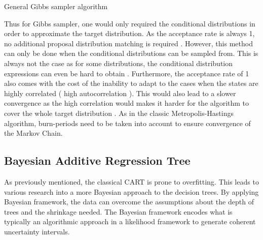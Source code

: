 \documentclass{usiinftr}
\begin{document}
\begin{algorithm}[h]
  \caption{General Gibbs sampler algorithm} \label{algGibbs}
  \begin{algorithmic}[1]
    \Statex
    	\State { $ \vdots $ }
    \EndFor
    \State \Return{$\theta$}
    \EndFunction
  \end{algorithmic}
\end{algorithm}

Thus for Gibbs sampler, one would only required the conditional distributions in order to approximate the 
target distribution. As the acceptance rate is always 1, no additional proposal distribution matching is required \cite{21}. However, this method can only be done when the conditional distributions can be sampled from. This is always not the case as for some distributions, the conditional distribution expressions can even be hard to obtain \cite{21}. Furthermore, the acceptance rate of 1 also comes with the cost of the inability to adapt to the cases when the states are highly correlated ( high autocorrelation ). This would also lead to a slower convergence as the high correlation would makes it harder for the algorithm to cover the whole target distribution \cite{21}. As in the classic Metropolis-Hastings algorithm, burn-periods need to be taken into account to ensure convergence of the Markov Chain.

\subsection{Bayesian Additive Regression Tree}
As previously mentioned, the classical CART is prone to overfitting. This leads to various research into a more Bayesian approach to the decision trees. By applying Bayesian framework, the data can overcome the assumptions about the depth of trees and the shrinkage needed. The Bayesian framework encodes what is typically an algorithmic approach in a likelihood framework to generate coherent uncertainty intervals.
\end{document}
